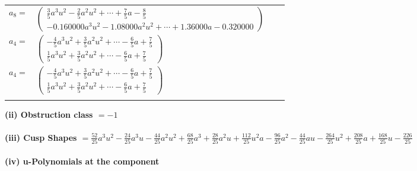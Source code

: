 \documentclass[1p]{elsarticle_modified}
\theoremstyle{definition}
\begin{document}
\begin{tabular}{m{7pt} m{180pt} m{7pt} m{180pt} }
\flushright $a_{8}=$&$\begin{pmatrix}\frac{3}{5} a^3 u^2-\frac{2}{5} a^2 u^2+\cdots+\frac{7}{5} a-\frac{8}{5}\\-0.160000 a^{3} u^{2}-1.08000 a^{2} u^{2}+\cdots+1.36000 a-0.320000\end{pmatrix}$ \\
\flushright $a_{4}=$&$\begin{pmatrix}-\frac{4}{5} a^3 u^2+\frac{3}{5} a^2 u^2+\cdots-\frac{6}{5} a+\frac{7}{5}\\\frac{1}{5} a^3 u^2+\frac{3}{5} a^2 u^2+\cdots-\frac{6}{5} a+\frac{7}{5}\end{pmatrix}$\\ \flushright $a_{4}=$&$\begin{pmatrix}-\frac{4}{5} a^3 u^2+\frac{3}{5} a^2 u^2+\cdots-\frac{6}{5} a+\frac{7}{5}\\\frac{1}{5} a^3 u^2+\frac{3}{5} a^2 u^2+\cdots-\frac{6}{5} a+\frac{7}{5}\end{pmatrix}$\\&\end{tabular}
\flushleft \textbf{(ii) Obstruction class $= -1$}\\~\\
\flushleft \textbf{(iii) Cusp Shapes $= \frac{52}{25} a^3 u^2-\frac{24}{25} a^3 u-\frac{44}{25} a^2 u^2+\frac{68}{25} a^3+\frac{28}{25} a^2 u+\frac{112}{25} u^2 a-\frac{96}{25} a^2-\frac{44}{25} a u-\frac{264}{25} u^2+\frac{208}{25} a+\frac{168}{25} u-\frac{226}{25}$}\\~\\
\newpage\renewcommand{\arraystretch}{1}
\flushleft \textbf{(iv) u-Polynomials at the component}\newline \\
\end{document}
